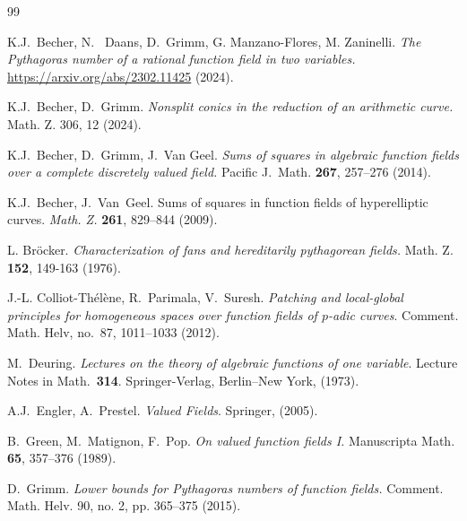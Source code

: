 \documentclass[a4paper,12pt,reqno]{amsart}
\theoremstyle{definition}
\numberwithin{equation}{thm}
\begin{document}
\begin{thebibliography}{99}

 K.J.~Becher, N.~ Daans, D.~Grimm, G. Manzano-Flores, M. Zaninelli. \textit{The Pythagoras number of a rational function field in two variables.}
\url{https://arxiv.org/abs/2302.11425} (2024).

 K.J.~Becher, D.~Grimm. \textit{Nonsplit conics in the reduction of an arithmetic curve.} Math. Z. 306, 12 (2024).

K.J.~Becher, D.~Grimm, J.~Van Geel. \textit{Sums of squares in algebraic function fields over a complete discretely valued field.} Pacific J.~Math. {\bf 267}, 257--276 (2014).






 

 K.J.~Becher, J.~Van~Geel.
{Sums of squares in function fields of hyperelliptic curves}. \textit{Math. Z.} {\bf 261}, 829--844 (2009).



L. Br\"ocker. \textit{Characterization of fans and hereditarily pythagorean fields.} Math. Z. \textbf{152}, 149-163 (1976).

J.-L. Colliot-Th\'el\`ene, R.~Parimala, V.~Suresh. \textit{Patching and
  local-global principles for homogeneous spaces over function fields of
  $p$-adic curves}. Comment. Math. Helv, no.~87, 1011--1033 (2012).


   M.~Deuring.
\textit{Lectures on the theory of algebraic functions of one variable}. Lecture
Notes in Math.~{\bf 314}. Springer-Verlag, Berlin--New York, (1973). 



 A.J.~Engler, A.~Prestel. \textit{Valued Fields}. Springer, (2005).

B.~Green, M.~Matignon, F.~Pop. \textit{On valued function fields {I}.} Manuscripta Math. {\bf 65}, 357--376 (1989).


D.~Grimm. \textit{Lower bounds for Pythagoras numbers of function fields.} Comment. Math. Helv.
90, no. 2, pp. 365--375 (2015).



\end{thebibliography}
\end{document}
